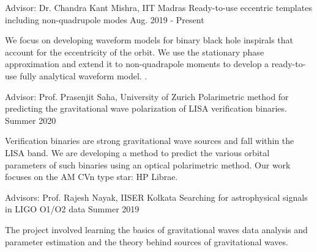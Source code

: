 

\vspace{4 mm}
\begin{cventries}

  \cventry
    {Advisor: Dr. Chandra Kant Mishra, IIT Madras} %
    {Ready-to-use eccentric templates including non-quadrupole modes} %
    {} %
    {Aug. 2019 - Present} %
    {
      \begin{cvitems} %
        \item {We focus on developing waveform models for binary black hole inspirals that account for the eccentricity of the orbit. We use the stationary phase approximation and extend it to non-quadrapole moments to develop a ready-to-use fully analytical waveform model. .}
      \end{cvitems}
    }

  \cventry
    {Advisor: Prof. Prasenjit Saha, University of Zurich} %
    {Polarimetric method for predicting the gravitational wave polarization of LISA verification binaries.} %
    {} %
    {Summer 2020} %
    {
      \begin{cvitems} %
        \item {Verification binaries are strong gravitational wave sources and fall within the LISA band.
        We are developing a method to predict the various orbital parameters of such binaries using an optical polarimetric method. Our work focuses on the AM CVn type star: HP Librae. }
      \end{cvitems}
    }

  \cventry
    {Advisors: Prof. Rajesh Nayak, IISER Kolkata} %
    {Searching for astrophysical signals in LIGO O1/O2 data} %
    {} %
    {Summer 2019} %
    {
      \begin{cvitems} %
        \item {The project involved learning the basics of gravitational waves data analysis and parameter estimation
and the theory behind sources of gravitational waves.}
      \end{cvitems}
    }


\end{cventries}
